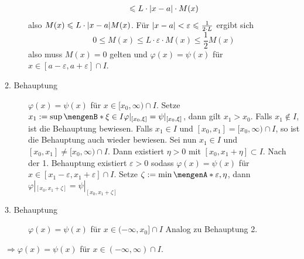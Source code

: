 \begin{description}
\begin{align*}
		\le L \cdot \abs*{x-a} \cdot M(x) 
	\end{align*}
	also $M(x) \le L \cdot \abs*{x-a} M(x) $. Für $\abs*{x-a} < \varepsilon\le \frac{1}{2 \cdot L} $ ergibt sich 
	\[
		0 \le M(x) \le L \cdot \varepsilon \cdot M(x) \le \frac{1}{2} M(x)
	\]
	also muss $M(x)=0$ gelten und $\varphi(x)= \psi(x)$ für $x \in [a-\varepsilon, a + \varepsilon] \cap I$.
	\item[2. Behauptung] $\varphi(x) = \psi(x)$ für $x \in [x_0,\infty) \cap I$.
	Setze $x_1 := \sup \set[\xi \in I]{\varphi|_{[x_0, \xi]} = \psi|_{[x_0, \xi]}} $, 
	dann gilt $x_1 > x_0$. Falls $x_1 \not\in I$, ist die Behauptung bewiesen. Falls
	$x_1 \in I$ und $[x_0, x_1]= [x_0, \infty) \cap I$, so ist die Behauptung auch wieder bewiesen. Sei nun $x_1 \in I$ und $[x_0, x_1] \not= [x_0, \infty) \cap I$. Dann 
	existiert $\eta >0$ mit $[x_0, x_1+ \eta] \subset I$. Nach der 1. Behauptung existiert $\varepsilon >0$ sodass $\varphi(x)=\psi(x)$ für 
	$x \in [x_1 -\varepsilon, x_1 + \varepsilon	] \cap I$. Setze $\zeta := \min \set{\varepsilon, \eta} $, dann $\varphi|_{[x_0, x_1 + \zeta]} = \psi|_{[x_0, x_1+ \zeta]}$
	\light
	\item[3. Behauptung] $\varphi(x) = \psi(x)$ für $x \in (- \infty, x_0] \cap I$
	Analog zu Behauptung 2.
\end{description}
$\Rightarrow \varphi(x)= \psi(x)$ für $x \in (- \infty, \infty) \cap I$. \bewende 

